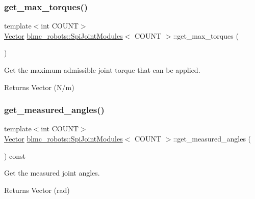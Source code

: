 \subsubsection{\texorpdfstring{get\+\_\+max\+\_\+torques()}{get\_max\_torques()}}
{\footnotesize\ttfamily template$<$int C\+O\+U\+NT$>$ \\
\hyperlink{classblmc__robots_1_1SpiJointModules_a2d48f81ec41a42a240e80cd22d4fa2f8}{Vector} \hyperlink{classblmc__robots_1_1SpiJointModules}{blmc\+\_\+robots\+::\+Spi\+Joint\+Modules}$<$ C\+O\+U\+NT $>$\+::get\+\_\+max\+\_\+torques (\begin{DoxyParamCaption}{ }\end{DoxyParamCaption})\hspace{0.3cm}{\ttfamily [inline]}}



Get the maximum admissible joint torque that can be applied. 

\begin{DoxyReturn}{Returns}
Vector (N/m) 
\end{DoxyReturn}
\mbox{\label{classblmc__robots_1_1SpiJointModules_a5e15bdf82a46aeddc671eb843f181459}} 
\subsubsection{\texorpdfstring{get\+\_\+measured\+\_\+angles()}{get\_measured\_angles()}}
{\footnotesize\ttfamily template$<$int C\+O\+U\+NT$>$ \\
\hyperlink{classblmc__robots_1_1SpiJointModules_a2d48f81ec41a42a240e80cd22d4fa2f8}{Vector} \hyperlink{classblmc__robots_1_1SpiJointModules}{blmc\+\_\+robots\+::\+Spi\+Joint\+Modules}$<$ C\+O\+U\+NT $>$\+::get\+\_\+measured\+\_\+angles (\begin{DoxyParamCaption}{ }\end{DoxyParamCaption}) const\hspace{0.3cm}{\ttfamily [inline]}}



Get the measured joint angles. 

\begin{DoxyReturn}{Returns}
Vector (rad) 
\end{DoxyReturn}
\mbox{\label{classblmc__robots_1_1SpiJointModules_ac4dff8f20dee3d73d8885f8f2d6fc141}} 
